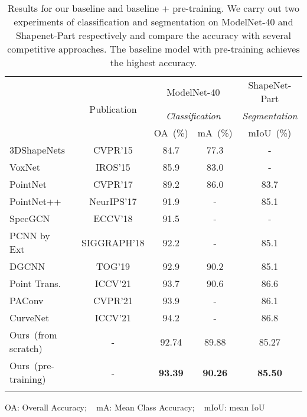 \documentclass[journal]{IEEEtran}
\begin{document}
\begin{table}[t]
\begin{center}
\vspace{-0.05in}
\footnotesize
\setlength{\tabcolsep}{0.5mm} {
\begin{tabular}{l|c|c|c|c}
\shline
\multirow{3}{*}{Methods} & 
\multirow{3}{*}{Publication} &
\multicolumn{2}{c|}{ModelNet-40} & \multicolumn{1}{c}{ShapeNet-Part} \\
& & \multicolumn{2}{c|}{\emph{Classification}} & \multicolumn{1}{c}{\emph{Segmentation}} \\
\cline{3-5}
& & OA~(\%) & mA~(\%) & mIoU~(\%) \\

\shline
3DShapeNets~\cite{wu20153d}& {\color{black} CVPR'15} & 84.7 &  77.3 & -  \\
VoxNet~\cite{maturana2015voxnet}& {\color{black}IROS'15}& 85.9  &  83.0 & -  \\
PointNet~\cite{qi2017pointnet}& {\color{black}CVPR'17} & 89.2  & 86.0 & 83.7  \\
PointNet++~\cite{qi2017pointnet++} & {\color{black}NeurIPS'17} & 91.9 & -  & 85.1 \\
SpecGCN~\cite{wang2018local}& {\color{black}ECCV'18} & 91.5 & - & -  \\
PCNN by Ext~~\cite{atzmon2018point}&{\color{black} SIGGRAPH'18} & 92.2 & - & 85.1  \\
DGCNN~\cite{wang2019dynamic}& {\color{black}TOG'19} & 92.9 & 90.2 & 85.1  \\
{\color{black}Point Trans.~\cite{zhao2021point}}& {\color{black}ICCV'21} & {\color{black}93.7} & {\color{black}90.6} & {\color{black}86.6}  \\
{\color{black}PAConv~\cite{xu2021paconv}}& {\color{black}CVPR'21} & {\color{black}93.9} & - & {\color{black}86.1}  \\ 
{\color{black}CurveNet~\cite{xiang2021walk}}& {\color{black}ICCV'21} & {\color{black}94.2} & {\color{black}-} & {\color{black}86.8}  \\


\hline
Ours~(from scratch)& -  & 92.74 & 89.88 & 85.27 \\
Ours~(pre-training)& - & \textbf{93.39} & \textbf{90.26} & \textbf{85.50}  \\

\shline
\end{tabular}
}
\end{center}
\caption{Results for our baseline and baseline + pre-training. 
We carry out two experiments of classification and segmentation on ModelNet-40 and Shapenet-Part respectively and compare the accuracy with several competitive approaches. 
The baseline model with pre-training achieves the highest accuracy.} 
\footnotesize{
OA: Overall Accuracy; ~
mA: Mean Class Accuracy; ~
mIoU: mean IoU}
\label{table:pre-train}
\end{table}
\end{document}
